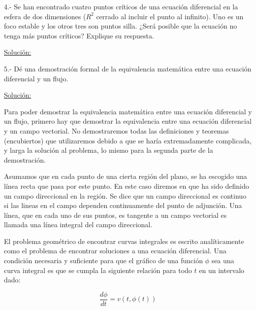 \documentclass[a4paper,10pt]{article}
\numberwithin{equation}{section}
\begin{document}
\newpage

4.- Se han encontrado cuatro puntos críticos de una ecuación diferencial en la esfera
de dos dimensiones ($R^2$ cerrado al incluir el punto al infinito). Uno es un foco
estable y los otros tres son puntos silla. ¿Será posible que la ecuación no tenga
más puntos críticos? Explique su respuesta.


\vspace{.3cm}

\underline{Solución:}

\vspace{.3cm}

5.- Dé una demostración formal de la equivalencia matemática entre una ecuación
diferencial y un flujo.

\vspace{.3cm}

\underline{Solución:}\vspace{.3cm}

Para poder demostrar la equivalencia matemática entre una ecuación diferencial y un flujo,
primero hay que demostrar la equivalencia entre una ecuación diferencial y un campo vectorial.
No demostraremos todas las definiciones y teoremas (encubiertos) que utilizaremos
debido a que se haría extremadamente complicada, y larga la solución al problema,
lo mismo para la segunda parte de la demostración.

\vspace{.3cm}

Asumamos que en cada punto de una cierta región del plano, se ha escogido una línea
recta que pasa por este punto. En este caso diremos en que ha sido definido un campo
direccional en la región. Se dice que un campo direccional es continuo si las lineas
en el campo dependen continuamente del punto de adjunción. Una línea, que en cada uno
de sus puntos, es tangente a un campo vectorial es llamada una línea integral del
campo direccional.

\vspace{.3cm}

El problema geométrico de encontrar curvas integrales es escrito analíticamente como el
problema de encontrar soluciones a una ecuación diferencial. Una condición necesaria 
y suficiente para que el gráfico de una función $\phi$ sea una curva integral 
es que se cumpla la siguiente relación para todo $t$ en un intervalo dado:

\begin{equation}
 \frac{d\phi}{dt} = v(t,\phi(t))
 \label{eq:pro5e1}
\end{equation}
\end{document}
